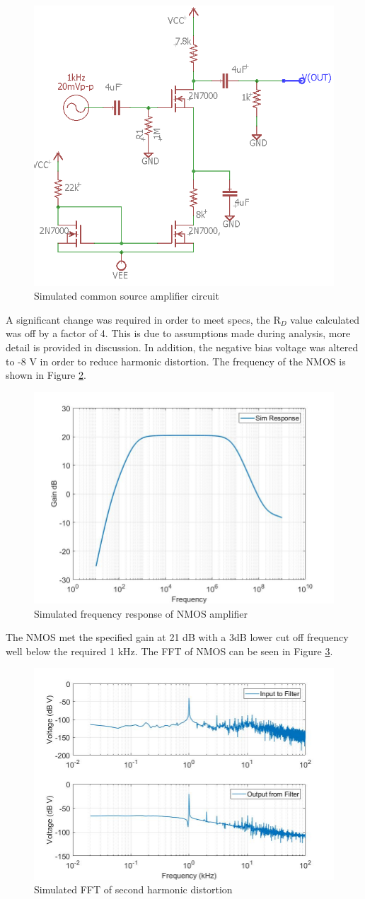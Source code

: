 	\begin{figure}[H]
		\centering
		\includegraphics[width=.55\textwidth]{CircuitDevelopment/NMOS_sim.png}
		\caption{Simulated common source amplifier circuit}
		\label{fig:NMOSsimcircuit}
	\end{figure}

	A significant change was required in order to meet specs, the R$_D$ value calculated was off by a factor of 4. This is due to assumptions made during analysis, more detail is provided in discussion. In addition, the negative bias voltage was altered to -8 V in order to reduce harmonic distortion. The frequency of the NMOS is shown in Figure \ref{fig:NMOSfreq}.
	
\begin{figure}[H]
		\centering
		\includegraphics[width=.55\textwidth]{CircuitDevelopment/NMOS_bandwidth.jpg}
		\caption{Simulated frequency response of NMOS amplifier}
		\label{fig:NMOSfreq}
\end{figure}

	The NMOS met the specified gain at 21 dB with a 3dB lower cut off frequency well below the required 1 kHz. The FFT of NMOS can be seen in Figure \ref{fig:nmosfft}.

\begin{figure}[H]
	\centering
	\includegraphics[width=.55\textwidth]{CircuitDevelopment/nmos_FFT.jpg}
	\caption{Simulated FFT of second harmonic distortion}
	\label{fig:nmosfft}
\end{figure}

